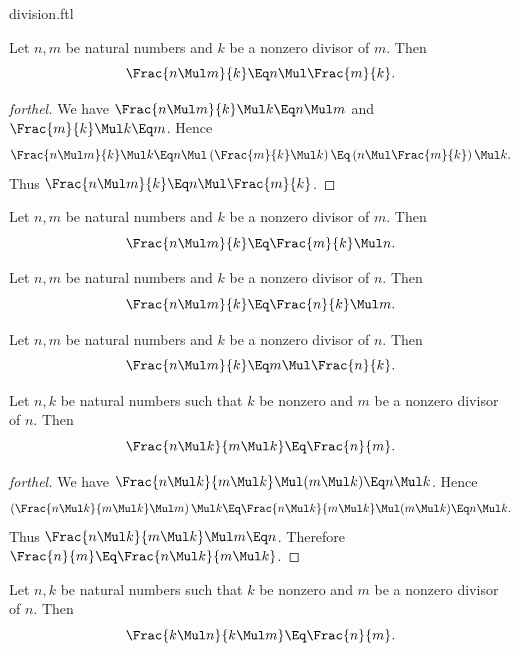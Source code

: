 \documentclass{stex}
\begin{document}
\begin{smodule}{division.ftl}
\begin{proposition*}[forthel]
  Let $n, m$ be natural numbers and $k$ be a nonzero divisor of $m$.
  Then \[\Frac{n \Mul m}{k} \Eq n \Mul \Frac{m}{k}.\]
\end{proposition*}
\begin{proof}[forthel]
  We have $\Frac{n \Mul m}{k} \Mul k \Eq n \Mul m$ and $\Frac{m}{k} \Mul k \Eq m$.
  Hence
  \[  \Frac{n \Mul m}{k} \Mul k
      \Eq n \Mul \left( \Frac{m}{k} \Mul k \right)
      \Eq \left( n \Mul \Frac{m}{k} \right) \Mul k. \]
  Thus $\Frac{n \Mul m}{k} \Eq n \Mul \Frac{m}{k}$.
\end{proof}

\begin{proposition*}[forthel]
  Let $n, m$ be natural numbers and $k$ be a nonzero divisor of $m$.
  Then \[\Frac{n \Mul m}{k} \Eq \Frac{m}{k} \Mul n.\]
\end{proposition*}

\begin{proposition*}[forthel]
  Let $n, m$ be natural numbers and $k$ be a nonzero divisor of $n$.
  Then \[\Frac{n \Mul m}{k} \Eq \Frac{n}{k} \Mul m.\]
\end{proposition*}

\begin{proposition*}[forthel]
  Let $n, m$ be natural numbers and $k$ be a nonzero divisor of $n$.
  Then \[\Frac{n \Mul m}{k} \Eq m \Mul \Frac{n}{k}.\]
\end{proposition*}

\begin{proposition*}[forthel]
  Let $n, k$ be natural numbers such that $k$ be nonzero and $m$ be a nonzero divisor of $n$.
  Then \[\Frac{n \Mul k}{m \Mul k} \Eq \Frac{n}{m}.\]
\end{proposition*}
\begin{proof}[forthel]
  We have $\Frac{n \Mul k}{m \Mul k} \Mul (m \Mul k) \Eq n \Mul k$.
  Hence
  \[  \left( \Frac{n \Mul k}{m \Mul k} \Mul m \right) \Mul k
      \Eq \Frac{n \Mul k}{m \Mul k} \Mul (m \Mul k)
      \Eq n \Mul k. \]
  Thus $\Frac{n \Mul k}{m \Mul k} \Mul m \Eq n$.
  Therefore $\Frac{n}{m} \Eq \Frac{n \Mul k}{m \Mul k}$.
\end{proof}

\begin{proposition*}[forthel]
  Let $n, k$ be natural numbers such that $k$ be nonzero and $m$ be a nonzero divisor of $n$.
  Then \[\Frac{k \Mul n}{k \Mul m} \Eq \Frac{n}{m}.\]
\end{proposition*}

\end{smodule}
\end{document}
